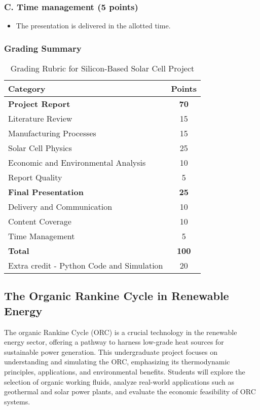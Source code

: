 \documentclass[11pt]{article}
\begin{document}
\subsubsection*{C. Time management (5 points)}
\begin{itemize}
    \item The presentation is delivered in the allotted time.
\end{itemize}
\newpage
\subsubsection*{Grading Summary}
\begin{table}[h!]
    \centering
    \begin{tabular}{|l|c|}
        \hline
        \textbf{Category} & \textbf{Points} \\
        \hline
        \textbf{Project Report} & \textbf{70} \\
        Literature Review & 15 \\
        Manufacturing Processes & 15 \\
        Solar Cell Physics & 25 \\
        Economic and Environmental Analysis & 10 \\
        Report Quality & 5 \\
        \hline
        \textbf{Final Presentation} & \textbf{25} \\
        Delivery and Communication & 10 \\
        Content Coverage & 10 \\
        Time Management & 5 \\
        \hline
        \textbf{Total} & \textbf{100} \\
        \hline
         Extra credit - Python Code and Simulation & 20 \\
         \hline
    \end{tabular}
    \caption{Grading Rubric for Silicon-Based Solar Cell Project}
\end{table}

\newpage
\subsection{The Organic Rankine Cycle in Renewable Energy}

The organic Rankine Cycle (ORC) is a crucial technology in the renewable energy sector, offering a pathway to harness low-grade heat sources for sustainable power generation. This undergraduate project focuses on understanding and simulating the ORC, emphasizing its thermodynamic principles, applications, and environmental benefits. Students will explore the selection of organic working fluids, analyze real-world applications such as geothermal and solar power plants, and evaluate the economic feasibility of ORC systems. 
\end{document}
